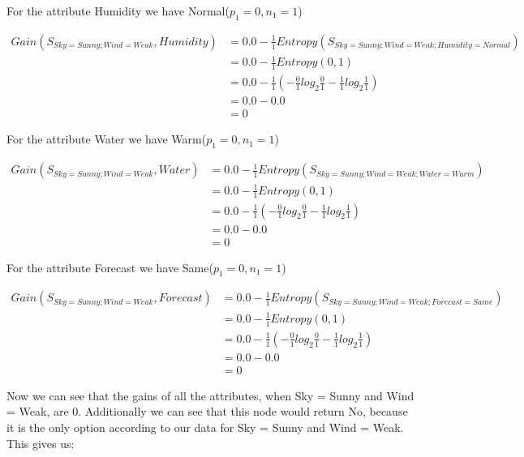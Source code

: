 \documentclass[10pt,a4paper]{article}
\begin{document}
{{{{{{{{{{For the attribute Humidity we have Normal($p_1=0,n_1=1$)
 
\begin{equation}
\begin{split}
Gain(S_{Sky=Sunny;Wind=Weak},Humidity) &= 0.0 - \frac{1}{1} Entropy(S_{Sky=Sunny;Wind=Weak;Humidity=Normal} )\\
          &= 0.0 - \frac{1}{1} Entropy(0,1) \\
          &= 0.0 - \frac{1}{1}( -\frac{0}{1} log_2\frac{0}{1} -\frac{1}{1} log_2\frac{1}{1} ) \\
          &= 0.0 - 0.0  \\
          &= 0
\end{split}
\end{equation}

For the attribute Water we have Warm($p_1=0,n_1=1$)
 
\begin{equation}
\begin{split}
Gain(S_{Sky=Sunny;Wind=Weak},Water) &= 0.0 - \frac{1}{1} Entropy(S_{Sky=Sunny;Wind=Weak;Water=Warm} )\\
          &= 0.0 - \frac{1}{1} Entropy(0,1) \\
          &= 0.0 - \frac{1}{1}( -\frac{0}{1} log_2\frac{0}{1} -\frac{1}{1} log_2\frac{1}{1} ) \\
          &= 0.0 - 0.0  \\
          &= 0
\end{split}
\end{equation}

For the attribute Forecast we have Same($p_1=0,n_1=1$)
 
\begin{equation}
\begin{split}
Gain(S_{Sky=Sunny;Wind=Weak},Forecast) &= 0.0 - \frac{1}{1} Entropy(S_{Sky=Sunny;Wind=Weak;Forecast=Same} )\\
          &= 0.0 - \frac{1}{1} Entropy(0,1) \\
          &= 0.0 - \frac{1}{1}( -\frac{0}{1} log_2\frac{0}{1} -\frac{1}{1} log_2\frac{1}{1} ) \\
          &= 0.0 - 0.0  \\
          &= 0
\end{split}
\end{equation}

Now we can see that the gains of all the attributes, when Sky = Sunny and Wind = Weak, are 0. Additionally we can see that this node would return No, because it is the only option according to our data for Sky = Sunny and Wind = Weak. This gives us:

}}}}}}}}}}
\end{document}
